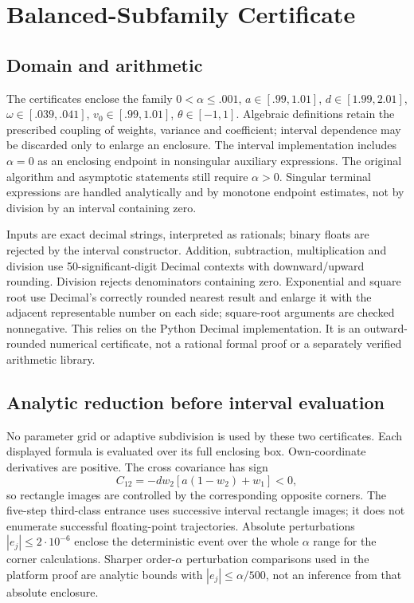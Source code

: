 \section{Balanced-Subfamily Certificate}\label{sec:certificate}
\subsection{Domain and arithmetic}
The certificates enclose the family $0<\alpha\le.001$, $a\in[.99,1.01]$, $d\in[1.99,2.01]$, $\omega\in[.039,.041]$, $v_0\in[.99,1.01]$, $\theta\in[-1,1]$. Algebraic definitions retain the prescribed coupling of weights, variance and coefficient; interval dependence may be discarded only to enlarge an enclosure. The interval implementation includes $\alpha=0$ as an enclosing endpoint in nonsingular auxiliary expressions. The original algorithm and asymptotic statements still require $\alpha>0$. Singular terminal expressions are handled analytically and by monotone endpoint estimates, not by division by an interval containing zero.

Inputs are exact decimal strings, interpreted as rationals; binary floats are rejected by the interval constructor. Addition, subtraction, multiplication and division use 50-significant-digit Decimal contexts with downward/upward rounding. Division rejects denominators containing zero. Exponential and square root use Decimal's correctly rounded nearest result and enlarge it with the adjacent representable number on each side; square-root arguments are checked nonnegative. This relies on the Python Decimal implementation. It is an outward-rounded numerical certificate, not a rational formal proof or a separately verified arithmetic library.

\subsection{Analytic reduction before interval evaluation}
No parameter grid or adaptive subdivision is used by these two certificates. Each displayed formula is evaluated over its full enclosing box. Own-coordinate derivatives are positive. The cross covariance has sign
\begin{equation}
C_{12}=-dw_2[a(1-w_2)+w_1]<0,
\end{equation}
so rectangle images are controlled by the corresponding opposite corners. The five-step third-class entrance uses successive interval rectangle images; it does not enumerate successful floating-point trajectories. Absolute perturbations $|e_j|\le2\cdot10^{-6}$ enclose the deterministic event over the whole $\alpha$ range for the corner calculations. Sharper order-$\alpha$ perturbation comparisons used in the platform proof are analytic bounds with $|e_j|\le\alpha/500$, not an inference from that absolute enclosure.

